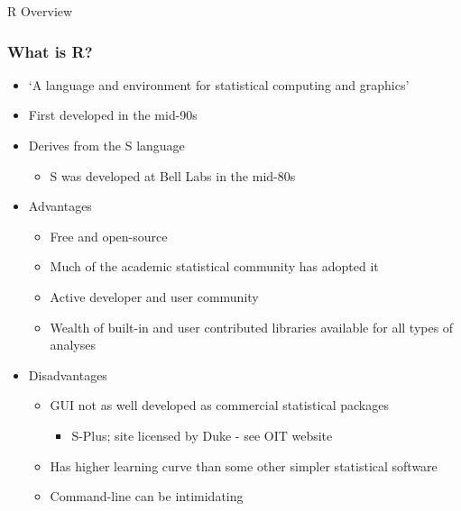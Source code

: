 \documentclass{beamer}
\begin{document}
\begin{frame}

\begin{center}
\LARGE{R Overview}

\end{center}
\end{frame}


\begin{frame}
  \frametitle{What is R?}
\begin{itemize}

\item `A language and environment for statistical computing and graphics'
\item First developed in the mid-90s
\item Derives from the S language
\begin{itemize}
	\item S was developed at Bell Labs in the mid-80s
\end{itemize}

\item Advantages

	\begin{itemize}
	\item Free and open-source
	\item Much of the academic statistical community has adopted it
	\item Active developer and user community
	\item Wealth of built-in and user contributed libraries available for all types of analyses
	\end{itemize}

\item Disadvantages
	\begin{itemize}
		\item GUI not as well developed as commercial statistical packages
			\begin{itemize}
				\item S-Plus; site licensed by Duke - see OIT website
			\end{itemize}
		\item Has higher learning curve than some other simpler statistical software
		\item Command-line can be intimidating
	\end{itemize}

\end{itemize}

\end{frame}
\end{document}
